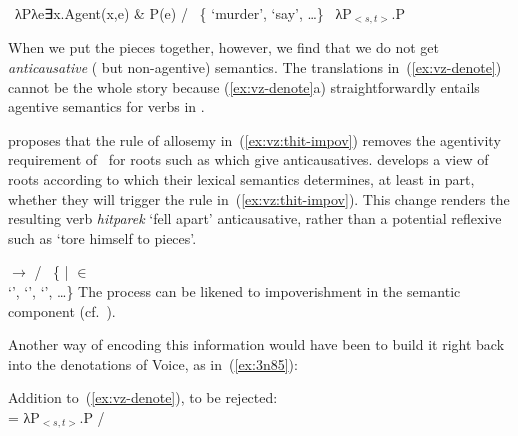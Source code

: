 \begin{exe}
\begin{xlist}
\begin{xlist}
\begin{exe}
\begin{xlist}
\begin{xlist}
\begin{exe}
\begin{xlist}
\begin{xlist}
\begin{exe}
\begin{exe}
\begin{xlist}
\begin{exe}
\begin{exe}
\begin{xlist}
\begin{exe}
\begin{exe}
\begin{exe}
\begin{exe}
\begin{exe}
\begin{xlist}
\begin{exe}
\begin{xlist}
\begin{exe}
\begin{exe}
\begin{xlist}
\begin{exe}
\begin{xlist}
\begin{exe}
\begin{xlist}
\begin{exe}
\begin{exe}
\begin{exe}
\begin{xlist}
\begin{exe}
\begin{exe}
\begin{exe}
\begin{xlist}
\begin{exe}
\begin{xlist}
\begin{exe}
\begin{exe}
\begin{xlist}
\begin{exe}
\begin{exe}
\begin{exe}
\begin{exe}
\begin{xlist}
\begin{exe}
\begin{xlist}
\begin{exe}
\begin{xlist}
\begin{exe}
\begin{xlist}
\begin{exe}
\begin{xlist}
\begin{exe}
\begin{xlist}
\begin{exe}
\begin{exe}
\begin{xlist}
\begin{exe}
\begin{xlist}
\begin{exe}
\begin{exe}
\begin{xlist}
\begin{exe}
\begin{xlist}
\begin{exe}
\begin{exe}
\begin{exe}
\begin{exe}
\begin{xlist}
\begin{xlist}
\begin{exe}
\begin{xlist}
\begin{exe}
\begin{exe}
\begin{exe}
\begin{xlist}
\begin{exe}
\begin{exe}
\begin{xlist}
\begin{exe}
\begin{exe}
\begin{exe}
\begin{xlist}
\begin{xlist}
\begin{exe}
\begin{xlist}
\begin{exe}
\begin{exe}
\begin{exe}
\begin{exe}
\begin{xlist}
\begin{exe}
\begin{xlist}
\begin{exe}
\begin{xlist}
\begin{exe}
\begin{xlist}
 	\ex  \denote{\vz} \lra~λPλe∃x.Agent(x,e) \& P(e) / \trace~\{ `murder',  `say’, \dots\} 
 	\ex  \denote{\vz} \lra~λP$_{<s,t>}$.P 
 \z
\z 

When we put the pieces together, however, we find that we do not get \textit{anticausative} ( but non-agentive) semantics. The translations in~(\ref{ex:vz-denote}) cannot be the whole story because (\ref{ex:vz-denote}a) straightforwardly entails agentive semantics for verbs in {\thit}.

\cite{kastner17gjgl} proposes that the rule of allosemy in~(\ref{ex:vz:thit-impov}) removes the agentivity requirement of {\va}~for roots such as  which give anticausatives. \cite{kastner16phd,kastner17gjgl} develops a view of roots according to which their lexical semantics determines, at least in part, whether they will trigger the rule in~(\ref{ex:vz:thit-impov}). This change renders the resulting verb \emph{hitparek} `fell apart' anticausative, rather than a potential reflexive such as `tore himself to pieces'.

 \begin{exe}
\ex \label{ex:vz:thit-impov}\denote{\va} $\rightarrow$ {\zero} / {\vz} \trace~\{ |  
  $\in$ 
 \\ \phantom{a} \hfill 
	 `',  `',  `', \dots\}
 \z 
The process can be likened to impoverishment \citep{bonet91,noyer98} in the semantic component (cf.~\citealt{nevins15roots}).

Another way of encoding this information would have been to build it right back into the denotations of Voice, as in~(\ref{ex:3n85}):

 \begin{exe}
\ex \sloppy \label{ex:3n85}Addition to~(\ref{ex:vz-denote}), to be rejected: \\
	\denote{\vz} = λP$_{<s,t>}$.P / 
\end{exe}
\end{exe}
\end{xlist}
\end{exe}
\end{xlist}
\end{exe}
\end{xlist}
\end{exe}
\end{xlist}
\end{exe}
\end{exe}
\end{exe}
\end{exe}
\end{xlist}
\end{exe}
\end{xlist}
\end{xlist}
\end{exe}
\end{exe}
\end{exe}
\end{xlist}
\end{exe}
\end{exe}
\end{xlist}
\end{exe}
\end{exe}
\end{exe}
\end{xlist}
\end{exe}
\end{xlist}
\end{xlist}
\end{exe}
\end{exe}
\end{exe}
\end{exe}
\end{xlist}
\end{exe}
\end{xlist}
\end{exe}
\end{exe}
\end{xlist}
\end{exe}
\end{xlist}
\end{exe}
\end{exe}
\end{xlist}
\end{exe}
\end{xlist}
\end{exe}
\end{xlist}
\end{exe}
\end{xlist}
\end{exe}
\end{xlist}
\end{exe}
\end{xlist}
\end{exe}
\end{exe}
\end{exe}
\end{exe}
\end{xlist}
\end{exe}
\end{exe}
\end{xlist}
\end{exe}
\end{xlist}
\end{exe}
\end{exe}
\end{exe}
\end{xlist}
\end{exe}
\end{exe}
\end{exe}
\end{xlist}
\end{exe}
\end{xlist}
\end{exe}
\end{xlist}
\end{exe}
\end{exe}
\end{xlist}
\end{exe}
\end{xlist}
\end{exe}
\end{exe}
\end{exe}
\end{exe}
\end{exe}
\end{xlist}
\end{exe}
\end{exe}
\end{xlist}
\end{exe}
\end{exe}
\end{xlist}
\end{xlist}
\end{exe}
\end{xlist}
\end{xlist}
\end{exe}
\end{xlist}
\end{xlist}
\end{exe}
